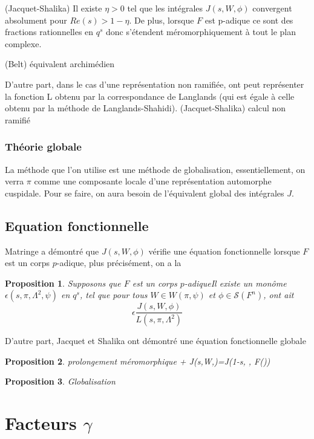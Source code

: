 \documentclass{amsart}
\newtheorem{proposition}{Proposition}
\begin{document}
  (Jacquet-Shalika) Il existe $\eta > 0$ tel que les intégrales $J(s, W, \phi)$ convergent absolument pour $Re(s) > 1 - \eta$.
  De plus, lorsque $F$ est p-adique ce sont des fractions rationnelles en $q^{s}$ donc s'étendent méromorphiquement à tout le plan complexe.
  
  (Belt) équivalent archimédien
  
  D'autre part, dans le cas d'une représentation non ramifiée, ont peut représenter la fonction L obtenu par la correspondance de Langlands (qui est égale à celle obtenu par la méthode de Langlands-Shahidi).
  (Jacquet-Shalika) calcul non ramifié
  
  \subsubsection{Théorie globale}
  La méthode que l'on utilise est une méthode de globalisation, essentiellement, on verra $\pi$ comme une composante locale d'une représentation automorphe cuspidale. Pour se faire, on aura besoin de l'équivalent global des intégrales $J$.
  
  \subsection{Equation fonctionnelle}
  Matringe a démontré que $J(s, W, \phi)$ vérifie une équation fonctionnelle lorsque $F$ est un corps $p$-adique, plus précisément, on a la
 \begin{proposition}
 \label{funcloc}
 Supposons que $F$ est un corps $p$-adiqueIl existe un monôme $\epsilon(s,\pi,\Lambda^2,\psi)$ en $q^s$, tel que pour tous $W \in W(\pi,\psi)$ et $\phi \in \mathcal{S}(F^n)$, ont ait
 $$\epsilon \frac{J(s,W,\phi)}{L(s,\pi,\Lambda^2)}$$
 \end{proposition}
 
 D'autre part, Jacquet et Shalika ont démontré une équation fonctionnelle globale
 \begin{proposition}
 \label{funcglob}
 prolongement méromorphique +
 J(s,W,\phi)=J(1-s, , F(\phi))
 \end{proposition}
 
 \begin{proposition}
 \label{globalisation}
 Globalisation
 \end{proposition}
 
 \section{Facteurs $\gamma$}
 
\end{document}
